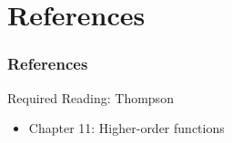 \documentclass[dvipsnames]{beamer}
\theoremstyle{plain}
\begin{document}
\section*{References}

\begin{frame}
  \frametitle{References}

  \begin{block}{Required Reading: Thompson}
    \begin{itemize}
      \item Chapter 11: \alert{Higher-order functions}
    \end{itemize}
  \end{block}
\end{frame}
\end{document}
